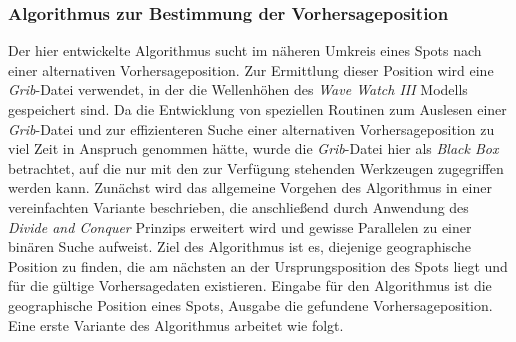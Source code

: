 \subsubsection{Algorithmus zur Bestimmung der Vorhersageposition}
Der hier entwickelte Algorithmus sucht im näheren Umkreis eines Spots
nach einer alternativen Vorhersageposition. Zur Ermittlung dieser
Position wird eine \textit{Grib}-Datei verwendet, in der die
Wellenhöhen des \textit{Wave Watch III} Modells gespeichert sind. Da
die Entwicklung von speziellen Routinen zum Auslesen einer
\textit{Grib}-Datei und zur effizienteren Suche einer alternativen
Vorhersageposition zu viel Zeit in Anspruch genommen hätte, wurde die
\textit{Grib}-Datei hier als \textit{Black Box} betrachtet, auf die
nur mit den zur Verfügung stehenden Werkzeugen zugegriffen werden
kann. Zunächst wird das allgemeine Vorgehen des Algorithmus in einer
vereinfachten Variante beschrieben, die anschließend durch Anwendung
des \textit{Divide and Conquer} Prinzips erweitert wird und gewisse
Parallelen zu einer binären Suche aufweist. Ziel des Algorithmus ist
es, diejenige geographische Position zu finden, die am nächsten an der
Ursprungsposition des Spots liegt und für die gültige Vorhersagedaten
existieren. Eingabe für den Algorithmus ist die geographische Position
eines Spots, Ausgabe die gefundene Vorhersageposition. Eine erste
Variante des Algorithmus arbeitet wie folgt.

